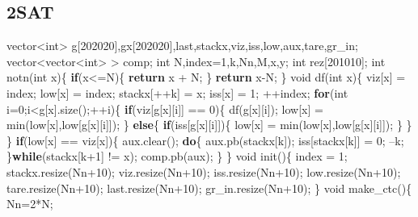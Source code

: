 \documentclass[10pt,]{article}
\newenvironment{Shaded}{}{}
\newcommand{\KeywordTok}[1]{\textcolor[rgb]{0.00,0.44,0.13}{\textbf{{#1}}}}
\newcommand{\DataTypeTok}[1]{\textcolor[rgb]{0.56,0.13,0.00}{{#1}}}
\newcommand{\DecValTok}[1]{\textcolor[rgb]{0.25,0.63,0.44}{{#1}}}
\newcommand{\NormalTok}[1]{{#1}}
\begin{document}
\subsection{2SAT}

\begin{Shaded}
\begin{Highlighting}[]
\NormalTok{vector<}\DataTypeTok{int}\NormalTok{> g[}\DecValTok{202020}\NormalTok{],gx[}\DecValTok{202020}\NormalTok{],last,stackx,viz,iss,low,aux,tare,gr_in;}
\NormalTok{vector<vector<}\DataTypeTok{int}\NormalTok{> > comp;}
\DataTypeTok{int} \NormalTok{N,index=}\DecValTok{1}\NormalTok{,k,Nn,M,x,y;}
\DataTypeTok{int} \NormalTok{rez[}\DecValTok{201010}\NormalTok{];}
\DataTypeTok{int} \NormalTok{notn(}\DataTypeTok{int} \NormalTok{x)\{}
  \KeywordTok{if}\NormalTok{(x<=N)\{}
    \KeywordTok{return} \NormalTok{x + N;}
  \NormalTok{\}}
  \KeywordTok{return} \NormalTok{x-N;}
\NormalTok{\}}
\DataTypeTok{void} \NormalTok{df(}\DataTypeTok{int} \NormalTok{x)\{}
  \NormalTok{viz[x] = index;}
  \NormalTok{low[x] = index;}
  \NormalTok{stackx[++k] = x;}
  \NormalTok{iss[x] = }\DecValTok{1}\NormalTok{;}
  \NormalTok{++index;}
  \KeywordTok{for}\NormalTok{(}\DataTypeTok{int} \NormalTok{i=}\DecValTok{0}\NormalTok{;i<g[x].size();++i)\{}
    \KeywordTok{if}\NormalTok{(viz[g[x][i]] == }\DecValTok{0}\NormalTok{)\{}
      \NormalTok{df(g[x][i]);}
      \NormalTok{low[x] = min(low[x],low[g[x][i]]);}
    \NormalTok{\} }\KeywordTok{else}\NormalTok{\{}
      \KeywordTok{if}\NormalTok{(iss[g[x][i]])\{}
        \NormalTok{low[x] = min(low[x],low[g[x][i]]);}
      \NormalTok{\}}
    \NormalTok{\}}
  \NormalTok{\}}
  \KeywordTok{if}\NormalTok{(low[x] == viz[x])\{}
    \NormalTok{aux.clear();}
    \KeywordTok{do}\NormalTok{\{}
      \NormalTok{aux.pb(stackx[k]);}
      \NormalTok{iss[stackx[k]] = }\DecValTok{0}\NormalTok{;}
      \NormalTok{--k;}
    \NormalTok{\}}\KeywordTok{while}\NormalTok{(stackx[k}\DecValTok{+1}\NormalTok{] != x);}
    \NormalTok{comp.pb(aux);}
  \NormalTok{\}}
\NormalTok{\}}
\DataTypeTok{void} \NormalTok{init()\{}
  \NormalTok{index = }\DecValTok{1}\NormalTok{;}
  \NormalTok{stackx.resize(Nn}\DecValTok{+10}\NormalTok{);}
  \NormalTok{viz.resize(Nn}\DecValTok{+10}\NormalTok{);}
  \NormalTok{iss.resize(Nn}\DecValTok{+10}\NormalTok{);}
  \NormalTok{low.resize(Nn}\DecValTok{+10}\NormalTok{);}
  \NormalTok{tare.resize(Nn}\DecValTok{+10}\NormalTok{);}
  \NormalTok{last.resize(Nn}\DecValTok{+10}\NormalTok{);}
  \NormalTok{gr_in.resize(Nn}\DecValTok{+10}\NormalTok{);}
\NormalTok{\}}
\DataTypeTok{void} \NormalTok{make_ctc()\{}
  \NormalTok{Nn=}\DecValTok{2}\NormalTok{*N;}

\end{Highlighting}
\end{Shaded}
\end{document}
